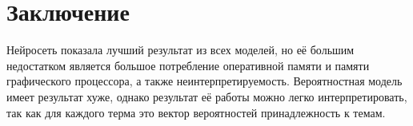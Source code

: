 \documentclass[a4paper, 12pt]{article}
\begin{document}
\section{Заключение}

Нейросеть показала лучший результат из всех моделей, но её большим недостатком является большое потребление оперативной памяти и памяти графического процессора, а также неинтерпретируемость. Вероятностная модель имеет результат хуже, однако результат её работы можно легко интерпретировать, так как для каждого терма это вектор вероятностей принадлежность к темам.



\end{document}
